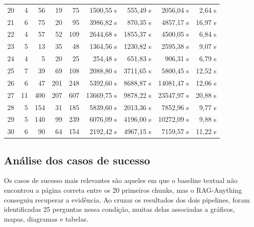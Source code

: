 \begin{table}[htbp]
{\begin{tabular}{r r r r r r r r r}
20 & 4 & 56 & 19 & 75 & 1500,55 s & 555,49 s & 2056,04 s & 2,64 s \\
21 & 6 & 75 & 20 & 95 & 3986,82 s & 870,35 s & 4857,17 s & 16,97 s \\
22 & 4 & 57 & 52 & 109 & 2644,68 s & 1855,37 s & 4500,05 s & 6,84 s \\
23 & 5 & 13 & 35 & 48 & 1364,56 s & 1230,82 s & 2595,38 s & 9,07 s \\
24 & 4 & 5 & 20 & 25 & 254,48 s & 651,83 s & 906,31 s & 6,79 s \\
25 & 7 & 39 & 69 & 108 & 2088,80 s & 3711,65 s & 5800,45 s & 12,52 s \\
26 & 6 & 47 & 201 & 248 & 5392,60 s & 8688,87 s & 14081,47 s & 12,06 s \\
27 & 11 & 400 & 207 & 607 & 13669,75 s & 9878,22 s & 23547,97 s & 20,88 s \\
28 & 5 & 154 & 31 & 185 & 5839,60 s & 2013,36 s & 7852,96 s & 9,77 s \\
29 & 5 & 140 & 99 & 239 & 6076,09 s & 4196,00 s & 10272,09 s & 9,88 s \\
30 & 6 & 90 & 64 & 154 & 2192,42 s & 4967,15 s & 7159,57 s & 11,22 s \\
\bottomrule
\end{tabular}
}
\end{table}

\subsection{Análise dos casos de sucesso}
\label{subsec:raganything-casos-sucesso}

Os casos de sucesso mais relevantes são aqueles em que o baseline textual não encontrou a página correta entre os 20 primeiros chunks, mas o RAG-Anything conseguiu recuperar a evidência. Ao cruzar os resultados dos dois pipelines, foram identificadas 25 perguntas nessa condição, muitas delas associadas a gráficos, mapas, diagramas e tabelas.

